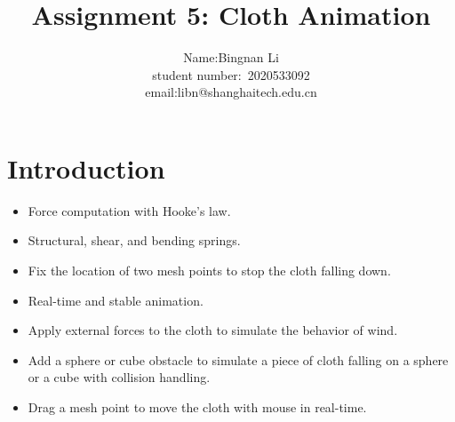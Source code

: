 \documentclass[acmtog]{acmart}
\title{Assignment 5: {Cloth Animation}}
\author{Name:\quad Bingnan Li \\ student number:\ 2020533092
\\email:\quad libn@shanghaitech.edu.cn}
\begin{document}
\maketitle

\vspace*{2 ex}

\section{Introduction}
\begin{itemize}
	\item Force computation with Hooke's law.
	\item Structural, shear, and bending springs.
	\item Fix the location of two mesh points to stop the cloth falling down.
	\item Real-time and stable animation.
	\item Apply external forces to the cloth to simulate the behavior of wind.
	\item Add a sphere or cube obstacle to simulate a piece of cloth falling on a sphere or a cube with collision handling.
	\item Drag a mesh point to move the cloth with mouse in real-time.
\end{itemize}
\end{document}
